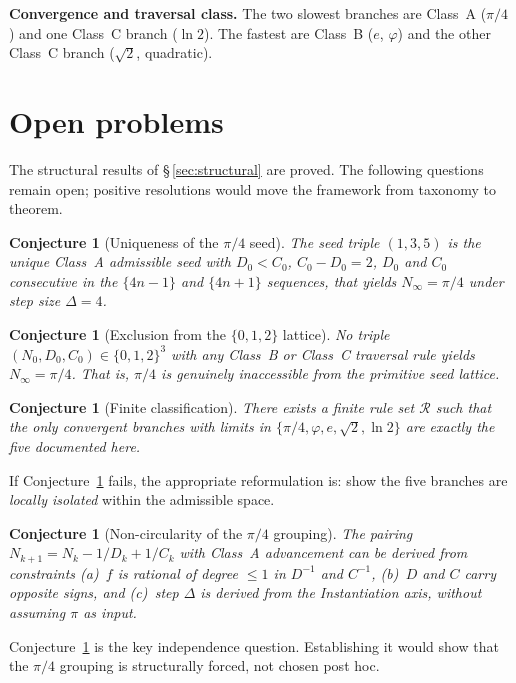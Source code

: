 \documentclass[12pt]{article}
\newtheorem{conjecture}[theorem]{Conjecture}
\theoremstyle{definition}
\theoremstyle{remark}
\begin{document}
\textbf{Convergence and traversal class.} The two slowest branches are Class~A ($\pi/4$)
and one Class~C branch ($\ln 2$). The fastest are Class~B ($e$, $\varphi$) and the other
Class~C branch ($\sqrt{2}$, quadratic).

\section{Open problems}\label{sec:open}
The structural results of \S\,\ref{sec:structural} are proved. The following questions
remain open; positive resolutions would move the framework from taxonomy to theorem.
\begin{conjecture}[Uniqueness of the $\pi/4$ seed]\label{conj:uniqueness}
The seed triple $(1, 3, 5)$ is the unique Class~A admissible seed with $D_0 < C_0$,
$C_0 - D_0 = 2$, $D_0$ and $C_0$ consecutive in the $\{4n-1\}$ and $\{4n+1\}$ sequences,
that yields $N_\infty = \pi/4$ under step size $\Delta = 4$.
\end{conjecture}
\begin{conjecture}[Exclusion from the $\{0,1,2\}$ lattice]\label{conj:exclusion}
No triple $(N_0, D_0, C_0) \in \{0,1,2\}^3$ with any Class~B or Class~C traversal rule
yields $N_\infty = \pi/4$. That is, $\pi/4$ is genuinely inaccessible from the primitive
seed lattice.
\end{conjecture}
\begin{conjecture}[Finite classification]\label{conj:finite}
There exists a finite rule set $\mathcal{R}$ such that the only convergent branches with
limits in $\{\pi/4, \varphi, e, \sqrt{2}, \ln 2\}$ are exactly the five documented here.
\end{conjecture}
If Conjecture~\ref{conj:finite} fails, the appropriate reformulation is: show the five branches
are \emph{locally isolated} within the admissible space.
\begin{conjecture}[Non-circularity of the $\pi/4$ grouping]\label{conj:noncircularity}
The pairing $N_{k+1} = N_k - 1/D_k + 1/C_k$ with Class~A advancement can be derived from
constraints \emph{(a)}~$f$ is rational of degree $\leq 1$ in $D^{-1}$ and $C^{-1}$,
\emph{(b)}~$D$ and $C$ carry opposite signs, and \emph{(c)}~step $\Delta$ is derived from
the Instantiation axis, without assuming $\pi$ as input.
\end{conjecture}
Conjecture~\ref{conj:noncircularity} is the key independence question. Establishing it would
show that the $\pi/4$ grouping is structurally forced, not chosen post hoc.
\end{document}
